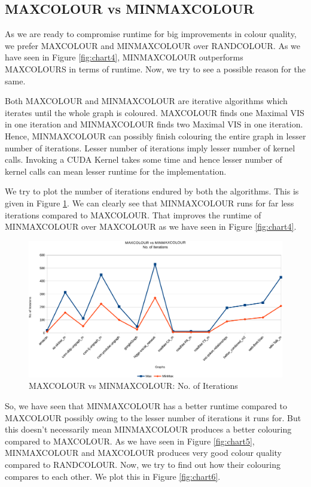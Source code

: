 \documentclass[MTech]{iitmdiss}
\begin{document}
\subsection{MAXCOLOUR vs MINMAXCOLOUR}
As we are ready to compromise runtime for big improvements in colour quality, we prefer MAXCOLOUR and MINMAXCOLOUR over RANDCOLOUR. As we have seen in Figure \ref{fig:chart4}, MINMAXCOLOUR outperforms MAXCOLOURS in terms of runtime. Now, we try to see a possible reason for the same.

Both MAXCOLOUR and MINMAXCOLOUR are iterative algorithms which iterates until the whole graph is coloured. MAXCOLOUR finds one Maximal VIS in one iteration and MINMAXCOLOUR finds two Maximal VIS in one iteration. Hence, MINMAXCOLOUR can possibly finish colouring the entire graph in lesser number of iterations. Lesser number of iterations imply lesser number of kernel calls. Invoking a CUDA Kernel takes some time and hence lesser number of kernel calls can mean lesser runtime for the implementation.

We try to plot the number of iterations endured by both the algorithms. This is given in Figure \ref{fig:chart1}. We can clearly see that MINMAXCOLOUR runs for far less iterations compared to MAXCOLOUR. That improves the runtime of MINMAXCOLOUR over MAXCOLOUR as we have seen in Figure \ref{fig:chart4}.

\begin{figure}[h]
    \centering
    \includegraphics[width=\textwidth,keepaspectratio=true]{chartNewest1.pdf}
    \caption{
        MAXCOLOUR vs MINMAXCOLOUR: No. of Iterations
    }
    \label{fig:chart1}
\end{figure}

So, we have seen that MINMAXCOLOUR has a better runtime compared to MAXCOLOUR possibly owing to the lesser number of iterations it runs for. But this doesn't necessarily mean MINMAXCOLOUR produces a better colouring compared to MAXCOLOUR. As we have seen in Figure \ref{fig:chart5}, MINMAXCOLOUR and MAXCOLOUR produces very good colour quality compared to RANDCOLOUR. Now, we try to find out how their colouring compares to each other. We plot this in 
Figure \ref{fig:chart6}.
\end{document}
